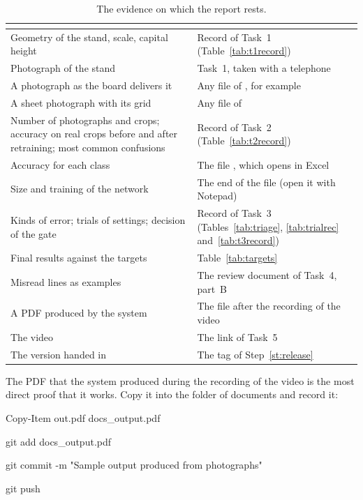 \begin{table}[H]
\centering
\begin{tabular}{L{4.6cm}L{6.6cm}}
\toprule
{} &  \\
\midrule
Geometry of the stand, scale, capital height & Record of Task~1 (Table~\ref{tab:t1record}) \\
Photograph of the stand & Task~1, taken with a telephone \\
A photograph as the board delivers it & Any file of , for example
   \\
A sheet photograph with its grid & Any file of  \\
Number of photographs and crops; accuracy on real crops before and after retraining; most
  common confusions & Record of Task~2 (Table~\ref{tab:t2record}) \\
Accuracy for each class & The file , which opens in
  Excel \\
Size and training of the network & The end of the file 
  (open it with Notepad) \\
Kinds of error; trials of settings; decision of the gate & Record of Task~3
  (Tables~\ref{tab:triage}, \ref{tab:trialrec} and~\ref{tab:t3record}) \\
Final results against the targets & Table~\ref{tab:targets} \\
Misread lines as examples & The review document of Task~4, part~B \\
A PDF produced by the system & The file  after the recording of
  the video \\
The video & The link of Task~5 \\
The version handed in & The tag of Step~\ref{st:release} \\
\bottomrule
\end{tabular}
\caption{The evidence on which the report rests.}
\label{tab:evidence}
\end{table}



The PDF that the system produced during the recording of the video is the most direct proof
that it works. Copy it into the folder of documents and record it:
\begin{ps}
Copy-Item out\document.pdf docs\sample_output.pdf
\end{ps}
\begin{ps}
git add docs\sample_output.pdf
\end{ps}
\begin{ps}
git commit -m "Sample output produced from photographs"
\end{ps}
\begin{ps}
git push
\end{ps}

